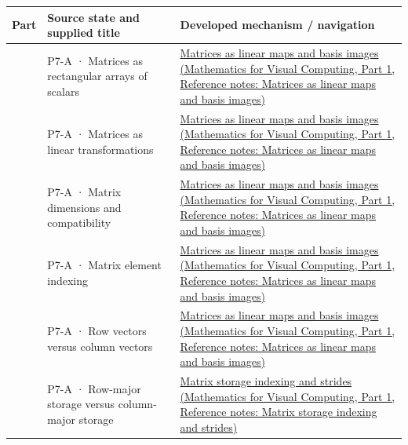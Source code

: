 {\def\LTcaptype{none} %
\begin{longtable}[]{@{}
  >{\raggedright\arraybackslash}p{}
  >{\raggedright\arraybackslash}p{}
  >{\raggedright\arraybackslash}p{}@{}}
\toprule\noalign{}
\begin{minipage}[b]{\linewidth}\raggedright
Part
\end{minipage} & \begin{minipage}[b]{\linewidth}\raggedright
Source state and supplied title
\end{minipage} & \begin{minipage}[b]{\linewidth}\raggedright
Developed mechanism / navigation
\end{minipage} \\
\midrule\noalign{}
\endhead
\bottomrule\noalign{}
\endlastfoot
601 & P7-A · Matrices as rectangular arrays of scalars & \href{../02-Mathematics-for-Visual-Computing-P01/main.pdf\#appendix-bd39c3bf5d64}{Matrices as linear maps and basis images (Mathematics for Visual Computing, Part 1, Reference notes: Matrices as linear maps and basis images)} \\
602 & P7-A · Matrices as linear transformations & \href{../02-Mathematics-for-Visual-Computing-P01/main.pdf\#appendix-bd39c3bf5d64}{Matrices as linear maps and basis images (Mathematics for Visual Computing, Part 1, Reference notes: Matrices as linear maps and basis images)} \\
603 & P7-A · Matrix dimensions and compatibility & \href{../02-Mathematics-for-Visual-Computing-P01/main.pdf\#appendix-bd39c3bf5d64}{Matrices as linear maps and basis images (Mathematics for Visual Computing, Part 1, Reference notes: Matrices as linear maps and basis images)} \\
604 & P7-A · Matrix element indexing & \href{../02-Mathematics-for-Visual-Computing-P01/main.pdf\#appendix-bd39c3bf5d64}{Matrices as linear maps and basis images (Mathematics for Visual Computing, Part 1, Reference notes: Matrices as linear maps and basis images)} \\
605 & P7-A · Row vectors versus column vectors & \href{../02-Mathematics-for-Visual-Computing-P01/main.pdf\#appendix-bd39c3bf5d64}{Matrices as linear maps and basis images (Mathematics for Visual Computing, Part 1, Reference notes: Matrices as linear maps and basis images)} \\
606 & P7-A · Row-major storage versus column-major storage & \href{../02-Mathematics-for-Visual-Computing-P01/main.pdf\#appendix-ffdc1d4e5350}{Matrix storage indexing and strides (Mathematics for Visual Computing, Part 1, Reference notes: Matrix storage indexing and strides)} \\

\end{longtable}}
